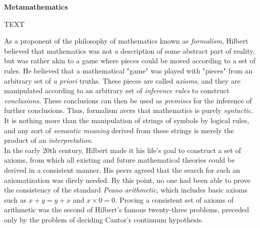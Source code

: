 
\begin{tcolorbox}[breakable, enhanced, colback=textbook-blue, sharp corners]
	\vspace{3mm}
	
	\begin{center}
		\textbf{Metamathematics}
	\end{center}

	TEXT
	
	\vspace{3mm}
\end{tcolorbox}
\vspace{2\baselineskip}

As a proponent of the philosophy of mathematics known as \textit{formalism}, Hilbert believed that mathematics was not a description of some abstract part of reality, but was rather akin to a game where pieces could be moved according to a set of rules. He believed that a mathematical "game" was played with "pieces" from an arbitrary set of \textit{a priori} truths. These pieces are called \textit{axioms}, and they are manipulated according to an arbitrary set of \textit{inference rules} to construct \textit{conclusions}. These conclusions can then be used as \textit{premises} for the inference of further conclusions. Thus, formalism avers that mathematics is purely \textit{syntactic}. It is nothing more than the manipulation of strings of symbols by logical rules, and any sort of \textit{semantic meaning} derived from these strings is merely the product of an \textit{interpretation}. \\

In the early 20th century, Hilbert made it his life's goal to construct a set of axioms, from which all existing and future mathematical theories could be derived in a consistent manner. His peers agreed that the search for such an axiomatization was direly needed. By this point, no one had been able to prove the consistency of the standard \textit{Peano arithmetic}, which includes basic axioms such as $x+y=y+x$ and $x\times0=0$. Proving a consistent set of axioms of arithmetic was the second of Hilbert's famous twenty-three problems, preceded only by the problem of deciding Cantor's continuum hypothesis. \\

